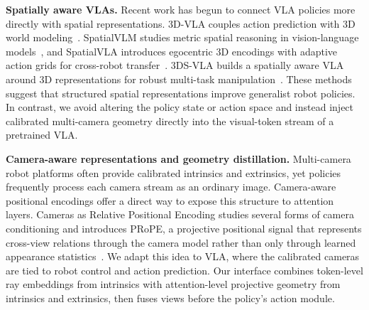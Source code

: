 \documentclass{article}
\begin{document}
\textbf{Spatially aware VLAs.}
Recent work has begun to connect VLA policies more directly with spatial representations. 3D-VLA couples action prediction with 3D world modeling~\citep{zhen2024threedvla}. SpatialVLM studies metric spatial reasoning in vision-language models~\citep{chen2024spatialvlm}, and SpatialVLA introduces egocentric 3D encodings with adaptive action grids for cross-robot transfer~\citep{qu2025spatialvla}. 3DS-VLA builds a spatially aware VLA around 3D representations for robust multi-task manipulation~\citep{li2025threedsvla}. These methods suggest that structured spatial representations improve generalist robot policies. In contrast, we avoid altering the policy state or action space and instead inject calibrated multi-camera geometry directly into the visual-token stream of a pretrained VLA.

\textbf{Camera-aware representations and geometry distillation.}
Multi-camera robot platforms often provide calibrated intrinsics and extrinsics, yet policies frequently process each camera stream as an ordinary image. Camera-aware positional encodings offer a direct way to expose this structure to attention layers. Cameras as Relative Positional Encoding studies several forms of camera conditioning and introduces PRoPE, a projective positional signal that represents cross-view relations through the camera model rather than only through learned appearance statistics~\citep{li2025cameras}. We adapt this idea to VLA, where the calibrated cameras are tied to robot control and action prediction. Our interface combines token-level ray embeddings from intrinsics with attention-level projective geometry from intrinsics and extrinsics, then fuses views before the policy's action module.




\end{document}
